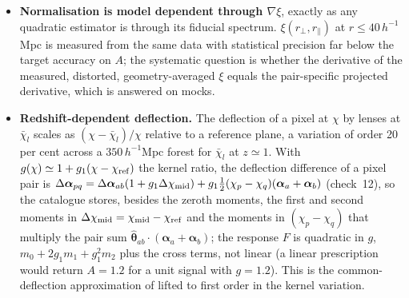 \documentclass[11pt,a4paper]{article}
\newcommand{\vth}{\bm{\theta}}
\begin{document}
\begin{itemize}
\item \textbf{Normalisation is model dependent through $\nabla\xi$}, exactly as any quadratic estimator is through its fiducial spectrum. $\xi(r_\perp,r_\parallel)$ at $r\le40\,h^{-1}$Mpc is measured from the same data with statistical precision far below the target accuracy on $A$; the systematic question is whether the derivative of the measured, distorted, geometry-averaged $\xi$ equals the pair-specific projected derivative, which is answered on mocks.
\item \textbf{Redshift-dependent deflection.} The deflection of a pixel at $\chi$ by lenses at $\bar\chi_l$ scales as $(\chi-\bar\chi_l)/\chi$ relative to a reference plane, a variation of order 20 per cent across a $350\,h^{-1}$Mpc forest for $\bar\chi_l$ at $z\simeq1$. With $g(\chi)\simeq1+g_1(\chi-\chi_{\rm ref})$ the kernel ratio, the deflection difference of a pixel pair is $\Delta\bm\alpha_{pq}=\Delta\bm\alpha_{ab}(1+g_1\Delta\chi_{\rm mid})+g_1\tfrac12(\chi_p-\chi_q)(\bm\alpha_a+\bm\alpha_b)$ (check~12), so the catalogue stores, besides the zeroth moments, the first and second moments in $\Delta\chi_{\rm mid}=\chi_{\rm mid}-\chi_{\rm ref}$ and the moments in $(\chi_p-\chi_q)$ that multiply the pair sum $\hat{\vth}_{ab}\cdot(\bm\alpha_a+\bm\alpha_b)$; the response $F$ is quadratic in $g$, $m_0+2g_1m_1+g_1^2m_2$ plus the cross terms, not linear (a linear prescription would return $A=1.2$ for a unit signal with $g=1.2$). This is the common-deflection approximation of \citet{2005.04109} lifted to first order in the kernel variation.
\end{itemize}
\end{document}
